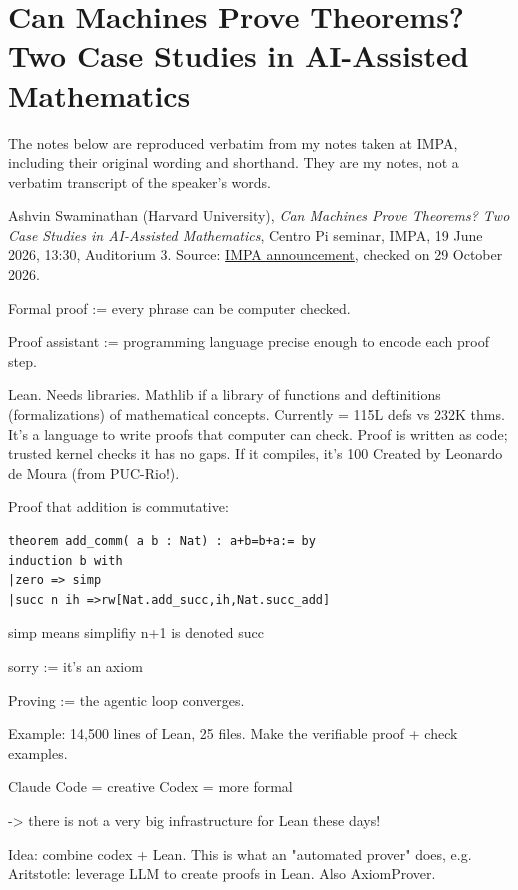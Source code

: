 \section{Can Machines Prove Theorems?
Two Case Studies in AI-Assisted
Mathematics}
\label{section-swaminathan-ai-lean}

The notes below are reproduced verbatim
from my notes taken at IMPA, including
their original wording and shorthand.
They are my notes, not a verbatim
transcript of the speaker's words.

Ashvin Swaminathan (Harvard University),
\emph{Can Machines Prove Theorems?
Two Case Studies in AI-Assisted
Mathematics}, Centro Pi seminar, IMPA,
19 June 2026, 13:30, Auditorium 3.
Source:
\href{https://seminarios.impa.br/%
visualizar/10500}{IMPA announcement},
checked on 29 October 2026.

\medskip

Formal proof :=
every phrase can be computer checked.

Proof assistant :=
programming language precise enough
to encode each proof step.

Lean. Needs libraries. 
Mathlib if a library of functions and
deftinitions (formalizations)
of mathematical concepts.
Currently = 115L defs vs 232K thms.
It's a language to write proofs that
computer can check.
Proof is written as code;
trusted kernel checks it has no gaps.
If it compiles, it's 100%
Created by Leonardo de Moura
(from PUC-Rio!).

Proof that addition is commutative:

\begin{verbatim}
theorem add_comm( a b : Nat) : a+b=b+a:= by
induction b with
|zero => simp
|succ n ih =>rw[Nat.add_succ,ih,Nat.succ_add]
\end{verbatim}

simp means simplifiy
n+1 is denoted succ

sorry := it's an axiom

Proving := the agentic loop converges.

Example: 14,500 lines of Lean, 25 files.
Make the verifiable proof + check examples.

Claude Code = creative
Codex = more formal

-> there is not a very big infrastructure
for Lean these days!

Idea: combine codex + Lean.
This is what an "automated prover" does,
e.g. Aritstotle: leverage LLM
to create proofs in Lean.
Also AxiomProver.


